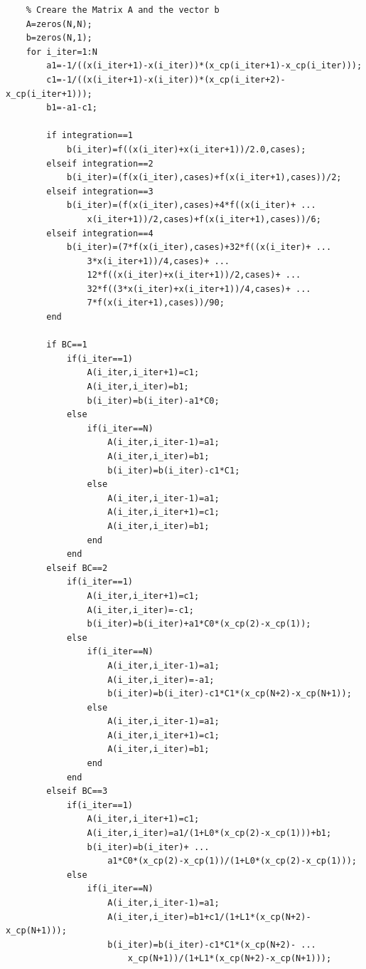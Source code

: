 \documentclass[a4paper]{article}
\numberwithin{equation}{section}
\begin{document}
\begin{verbatim}
    % Creare the Matrix A and the vector b
    A=zeros(N,N);
    b=zeros(N,1);
    for i_iter=1:N
        a1=-1/((x(i_iter+1)-x(i_iter))*(x_cp(i_iter+1)-x_cp(i_iter)));
        c1=-1/((x(i_iter+1)-x(i_iter))*(x_cp(i_iter+2)-x_cp(i_iter+1)));
        b1=-a1-c1;
        
        if integration==1
            b(i_iter)=f((x(i_iter)+x(i_iter+1))/2.0,cases);
        elseif integration==2
            b(i_iter)=(f(x(i_iter),cases)+f(x(i_iter+1),cases))/2;
        elseif integration==3
            b(i_iter)=(f(x(i_iter),cases)+4*f((x(i_iter)+ ...
                x(i_iter+1))/2,cases)+f(x(i_iter+1),cases))/6;
        elseif integration==4
            b(i_iter)=(7*f(x(i_iter),cases)+32*f((x(i_iter)+ ...
                3*x(i_iter+1))/4,cases)+ ...
                12*f((x(i_iter)+x(i_iter+1))/2,cases)+ ...
                32*f((3*x(i_iter)+x(i_iter+1))/4,cases)+ ...
                7*f(x(i_iter+1),cases))/90;
        end
        
        if BC==1
            if(i_iter==1)
                A(i_iter,i_iter+1)=c1;
                A(i_iter,i_iter)=b1;
                b(i_iter)=b(i_iter)-a1*C0;
            else
                if(i_iter==N)
                    A(i_iter,i_iter-1)=a1;
                    A(i_iter,i_iter)=b1;
                    b(i_iter)=b(i_iter)-c1*C1;
                else
                    A(i_iter,i_iter-1)=a1;
                    A(i_iter,i_iter+1)=c1;
                    A(i_iter,i_iter)=b1;
                end
            end
        elseif BC==2
            if(i_iter==1)
                A(i_iter,i_iter+1)=c1;
                A(i_iter,i_iter)=-c1;
                b(i_iter)=b(i_iter)+a1*C0*(x_cp(2)-x_cp(1));
            else
                if(i_iter==N)
                    A(i_iter,i_iter-1)=a1;
                    A(i_iter,i_iter)=-a1;
                    b(i_iter)=b(i_iter)-c1*C1*(x_cp(N+2)-x_cp(N+1));
                else
                    A(i_iter,i_iter-1)=a1;
                    A(i_iter,i_iter+1)=c1;
                    A(i_iter,i_iter)=b1;
                end
            end
        elseif BC==3
            if(i_iter==1)
                A(i_iter,i_iter+1)=c1;
                A(i_iter,i_iter)=a1/(1+L0*(x_cp(2)-x_cp(1)))+b1;
                b(i_iter)=b(i_iter)+ ...
                    a1*C0*(x_cp(2)-x_cp(1))/(1+L0*(x_cp(2)-x_cp(1)));
            else
                if(i_iter==N)
                    A(i_iter,i_iter-1)=a1;
                    A(i_iter,i_iter)=b1+c1/(1+L1*(x_cp(N+2)-x_cp(N+1)));
                    b(i_iter)=b(i_iter)-c1*C1*(x_cp(N+2)- ...
                        x_cp(N+1))/(1+L1*(x_cp(N+2)-x_cp(N+1)));
                    

\end{verbatim}
\end{document}
